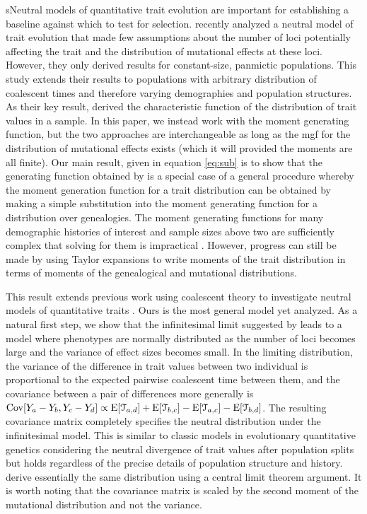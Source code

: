sNeutral models of quantitative trait evolution are important for establishing a
baseline against which to test for selection. \citet{Schraiber2015} recently
analyzed a neutral model of trait evolution that made few assumptions about the
number of loci potentially affecting the trait and the distribution of
mutational effects at these loci. However, they only derived results for
constant-size, panmictic populations. This study extends their results to
populations with arbitrary distribution of coalescent times and therefore
varying demographies and population structures. As their key result,
\citet{Schraiber2015} derived the characteristic function of the distribution of
trait values in a sample. In this paper, we instead work with the moment
generating function, but the two approaches are interchangeable as long as the
mgf for the distribution of mutational effects exists (which it will provided
the moments are all finite). Our main result, given in equation \eqref{eq:sub}
is to show that the generating function obtained by \citet{Schraiber2015} is a
special case of a general procedure whereby the moment generation function for a
trait distribution can be obtained by making a simple substitution into the
moment generating function for a distribution over genealogies. The moment
generating functions for many demographic histories of interest and sample sizes
above two are sufficiently complex that solving for them is impractical
\citep{Lohse2011}. However, progress can still be made by using Taylor
expansions to write moments of the trait distribution in terms of moments of the
genealogical and mutational distributions.

This result extends previous work using coalescent theory to investigate neutral
models of quantitative traits \citep{Whitlock1999,Schraiber2015}. Ours is the
most general model yet analyzed. As a natural first step, we show that the
infinitesimal limit suggested by \citet{Fisher1918} leads to a model where
phenotypes are normally distributed as the number of loci becomes large and the
variance of effect sizes becomes small. In the limiting distribution, the
variance of the difference in trait values between two individual is
proportional to the expected pairwise coalescent time between them, and the
covariance between a pair of differences more generally is $\mathrm{Cov}[Y_a - Y_b,Y_c -
Y_d] \propto \mathrm{E}[\mathcal{T}_{a,d}] + \mathrm{E}[\mathcal{T}_{b,c}] -
\mathrm{E}[\mathcal{T}_{a,c}] - \mathrm{E}[\mathcal{T}_{b,d}]$. The resulting covariance matrix
completely specifies the neutral distribution under the infinitesimal model.
This is similar to classic models in evolutionary quantitative genetics
considering the neutral divergence of trait values after population splits
\citep{Lande1976,Lynch1989} but holds regardless of the precise details of
population structure and history. \citet{Schraiber2015} derive essentially the
same distribution using a central limit theorem argument. It is worth noting
that the covariance matrix is scaled by the second moment of the mutational
distribution and not the variance.


